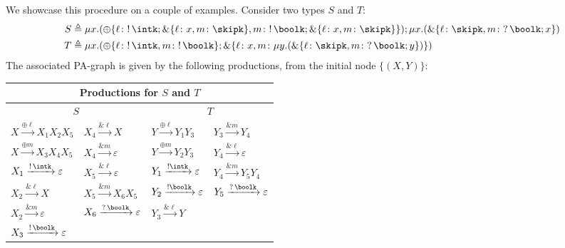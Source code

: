 We showcase this procedure on a couple of examples. %
%
Consider two types $S$ and $T$:
%
\begin{align*}
  S &\triangleq \mu x. (\oplus\{\ell\colon !\,\intk; \&\{\ell\colon x,
      m\colon \skipk \} , m\colon !\, \boolk; \&\{\ell\colon x,
      m\colon \skipk \} \}); \mu x. (\&\{\ell\colon\skipk, m\colon
      ?\,\boolk; x \})
  \\
  T &\triangleq \mu x. (\oplus\{\ell\colon !\,\intk , m\colon !\,
      \boolk\}; \&\{\ell\colon x, m\colon \mu
      y. (\&\{\ell\colon\skipk, m\colon ?\,\boolk; y \})\})
\end{align*}
%
The associated PA-graph is given by the following productions, from the initial node $\{(X,Y)\}$:
\begin{center}
\begin{tabular}{ |l l |l l| }
  \hline
  \multicolumn{4}{|c|}{Productions for $S$ and $T$} \\
  \hline
  \hline
\multicolumn{2}{|c|}{$S$}&  \multicolumn{2}{|c|}{$T$} \\ \hline
$X \xrightarrow{\oplus \ell} X_1 X_2 X_5$ & $X_4 \xrightarrow{\& \ell} X$ & $Y \xrightarrow{\oplus \ell} Y_1 Y_3$ & $Y_3 \xrightarrow{\& m} Y_4$ \\
$X \xrightarrow{\oplus m} X_3 X_4 X_5$& $X_4 \xrightarrow{\& m} \varepsilon$ & $Y \xrightarrow{\oplus m} Y_2 Y_3$ & $Y_4 \xrightarrow{\& \ell} \varepsilon$\\
$X_1 \xrightarrow{!\, \intk} \varepsilon$& $X_5 \xrightarrow{\& \ell} \varepsilon$& $Y_1 \xrightarrow{!\intk} \varepsilon$ & $Y_4 \xrightarrow{\& m} Y_5 Y_4$\\
$X_2 \xrightarrow{\& \ell} X$& $X_5 \xrightarrow{\& m} X_6 X_5$& $Y_2 \xrightarrow{!\boolk} \varepsilon$ & $Y_5 \xrightarrow{?\,\boolk} \varepsilon$\\
$X_2 \xrightarrow{\& m} \varepsilon$& $X_6 \xrightarrow{?\,\boolk} \varepsilon$& $Y_3 \xrightarrow{\& \ell} Y$ &\\
$X_3 \xrightarrow{!\, \boolk} \varepsilon$&&&\\
  \hline
\end{tabular}
\end{center}

